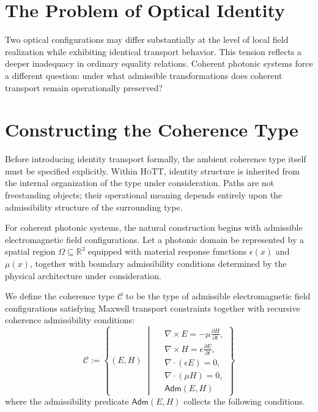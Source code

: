 \documentclass[11pt,openany]{book}
\theoremstyle{definition}
\theoremstyle{plain}
\newcommand{\HoTT}{\textsc{HoTT}}
\begin{document}
\bigskip

\section{The Problem of Optical Identity}

Two optical configurations may differ substantially at the level of local field realization while exhibiting identical transport behavior. This tension reflects a deeper inadequacy in ordinary equality relations. Coherent photonic systems force a different question: under what admissible transformations does coherent transport remain operationally preserved?

\section{Constructing the Coherence Type}

Before introducing identity transport formally, the ambient coherence type itself must be specified explicitly. Within \HoTT, identity structure is inherited from the internal organization of the type under consideration. Paths are not freestanding objects; their operational meaning depends entirely upon the admissibility structure of the surrounding type.

For coherent photonic systems, the natural construction begins with admissible electromagnetic field configurations. Let a photonic domain be represented by a spatial region $\Omega \subseteq \mathbb{R}^3$ equipped with material response functions $\epsilon(x)$ and $\mu(x)$, together with boundary admissibility conditions determined by the physical architecture under consideration.

We define the coherence type $\mathcal{C}$ to be the type of admissible electromagnetic field configurations satisfying Maxwell transport constraints together with recursive coherence admissibility conditions:
\[
\mathcal{C}
:=
\left\{
(E,H)
\;\middle|\;
\begin{aligned}
&
\nabla \times E
=
-\mu \frac{\partial H}{\partial t},
\\
&
\nabla \times H
=
\epsilon \frac{\partial E}{\partial t},
\\
&
\nabla \cdot (\epsilon E)=0,
\\
&
\nabla \cdot (\mu H)=0,
\\
&
\mathsf{Adm}(E,H)
\end{aligned}
\right\}
\]
where the admissibility predicate $\mathsf{Adm}(E,H)$ collects the following conditions.
\end{document}

